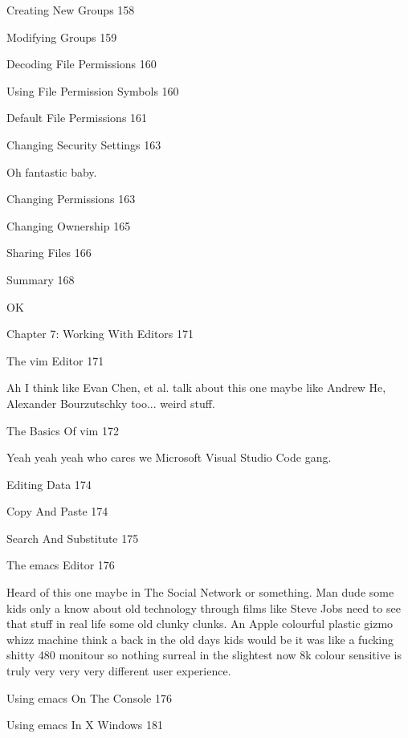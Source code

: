 Creating New Groups 158



Modifying Groups 159



Decoding File Permissions 160



Using File Permission Symbols 160



Default File Permissions 161



Changing Security Settings 163

Oh fantastic baby.

Changing Permissions 163



Changing Ownership 165



Sharing Files 166



Summary 168

OK

Chapter 7: Working With Editors 171



The vim Editor 171

Ah I think like Evan Chen, et al. talk about this one maybe like Andrew He, Alexander Bourzutschky too... weird stuff.

The Basics Of vim 172

Yeah yeah yeah who cares we Microsoft Visual Studio Code gang.

Editing Data 174



Copy And Paste 174



Search And Substitute 175



The emacs Editor 176

Heard of this one maybe in The Social Network or something. Man dude some kids only a know about old technology through films like Steve Jobs need to see that stuff in real life some old clunky clunks. An Apple colourful plastic gizmo whizz machine think a back in the old days kids would be it was like a fucking shitty 480 monitour so nothing surreal in the slightest now 8k colour sensitive is truly very very very different user experience.

Using emacs On The Console 176



Using emacs In X Windows 181



